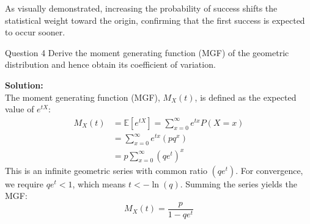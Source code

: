 \documentclass[11pt, a4paper]{article}
\newcommand{\E}{\mathbb{E}}
\begin{document}
\begin{center}
\end{center}

As visually demonstrated, increasing the probability of success shifts the statistical weight toward the origin, confirming that the first success is expected to occur sooner.

\clearpage
\begin{problem}{Question 4}
Derive the moment generating function (MGF) of the geometric distribution and hence obtain its coefficient of variation.
\end{problem}

\noindent\textbf{Solution:} \\
The moment generating function (MGF), $M_X(t)$, is defined as the expected value of $e^{tX}$:
\begin{align*}
    M_X(t) &= \E[e^{tX}] = \sum_{x=0}^{\infty} e^{tx} P(X=x) \\
    &= \sum_{x=0}^{\infty} e^{tx} (p q^x) \\
    &= p \sum_{x=0}^{\infty} (q e^t)^x
\end{align*}
This is an infinite geometric series with common ratio $(q e^t)$. For convergence, we require $qe^t < 1$, which means $t < -\ln(q)$. Summing the series yields the MGF:
\begin{equation}
    M_X(t) = \frac{p}{1 - q e^t}
\end{equation}
\end{document}
